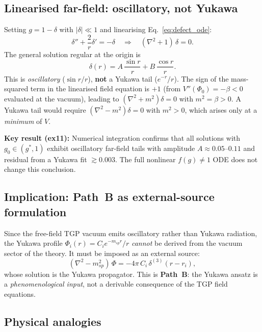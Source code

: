 \subsection{Linearised far-field: oscillatory, not Yukawa}

Setting $g=1-\delta$ with $|\delta|\ll 1$ and linearising
Eq.~\eqref{eq:defect_ode}:
\begin{equation}
  \delta'' + \frac{2}{r}\delta' = -\delta
  \quad\Longrightarrow\quad
  (\nabla^2+1)\,\delta = 0.
\label{eq:linearised}
\end{equation}
The general solution regular at the origin is
\begin{equation}
  \delta(r) = A\,\frac{\sin r}{r} + B\,\frac{\cos r}{r}.
\label{eq:oscillatory_tail}
\end{equation}
This is \emph{oscillatory} ($\sin r/r$), \textbf{not} a Yukawa tail
($e^{-r}/r$).  The sign of the mass-squared term in the linearised
field equation is $+1$ (from $V''(\Phi_0)=-\beta<0$ evaluated at the
vacuum), leading to $(\nabla^2+m^2)\delta=0$ with $m^2=\beta>0$.
A Yukawa tail would require $(\nabla^2-m^2)\delta=0$ with $m^2>0$,
which arises only at a \emph{minimum} of $V$.

\textbf{Key result (ex11):} Numerical integration confirms that all
solutions with $g_0\in(g^*,1)$ exhibit oscillatory far-field tails
with amplitude $A\approx0.05$--$0.11$ and residual from a Yukawa fit
$\gtrsim 0.003$.  The full nonlinear $f(g)\ne 1$ ODE does not change
this conclusion.

\subsection{Implication: Path~B as external-source formulation}

Since the free-field TGP vacuum emits oscillatory rather than Yukawa
radiation, the Yukawa profile $\Phi_i(r)=C_i e^{-m_{sp}r}/r$
\emph{cannot} be derived from the vacuum sector of the theory.
It must be imposed as an external source:
\begin{equation}
  (\nabla^2 - m_{sp}^2)\,\Phi = -4\pi\,C_i\,\delta^{(3)}(r-r_i),
\label{eq:external_source}
\end{equation}
whose solution is the Yukawa propagator.  This is \textbf{Path~B}:
the Yukawa ansatz is a \emph{phenomenological input}, not a derivable
consequence of the TGP field equations.

\subsection{Physical analogies}


